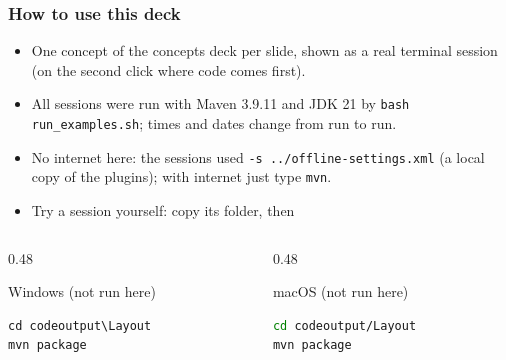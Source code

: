 \documentclass[aspectratio=169,10pt,compress]{beamer}
\begin{document}
\begin{frame}[t,fragile] \frametitle{How to use this deck}
  \begin{itemize}\small
    \item One concept of the concepts deck per slide, shown as a real terminal session (on the second click where code comes first).
    \item All sessions were run with Maven 3.9.11 and JDK 21 by \texttt{bash run\_examples.sh}; times and dates change from run to run.
    \item No internet here: the sessions used \texttt{-s ../offline-settings.xml} (a local copy of the plugins); with internet just type \texttt{mvn}.
    \item Try a session yourself: copy its folder, then
  \end{itemize}
  \begin{columns}[T]
    \begin{column}{0.48\textwidth}
      \begin{block}{Windows (not run here)}


\begin{lstlisting}[style=codesnippet, language={}, basicstyle=\ttfamily\scriptsize]
cd codeoutput\Layout
mvn package
\end{lstlisting}


      \end{block}
    \end{column}
    \begin{column}{0.48\textwidth}
      \begin{block}{macOS (not run here)}


\begin{lstlisting}[style=codesnippet, language=bash, basicstyle=\ttfamily\scriptsize]
cd codeoutput/Layout
mvn package
\end{lstlisting}


      \end{block}
    \end{column}
  \end{columns}
\end{frame}

\end{document}
